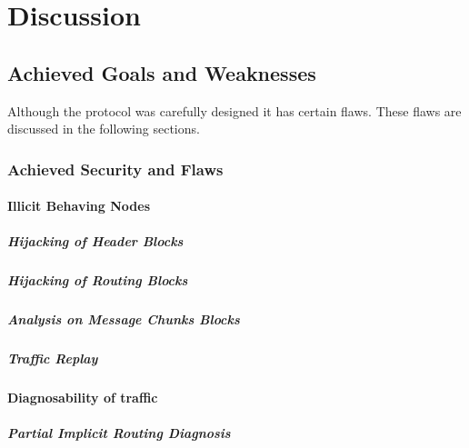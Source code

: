 
\part{Discussion}

\chapter{Achieved Goals and Weaknesses}
Although the protocol was carefully designed it has certain flaws. These flaws are discussed in the following sections.

\section{Achieved Security and Flaws}

\subsection{Illicit Behaving Nodes}
\subsubsection{Hijacking of Header Blocks}
\subsubsection{Hijacking of Routing Blocks}
\subsubsection{Analysis on Message Chunks Blocks}
\subsubsection{Traffic Replay}
\subsection{Diagnosability of traffic}
\subsubsection{Partial Implicit Routing Diagnosis}
